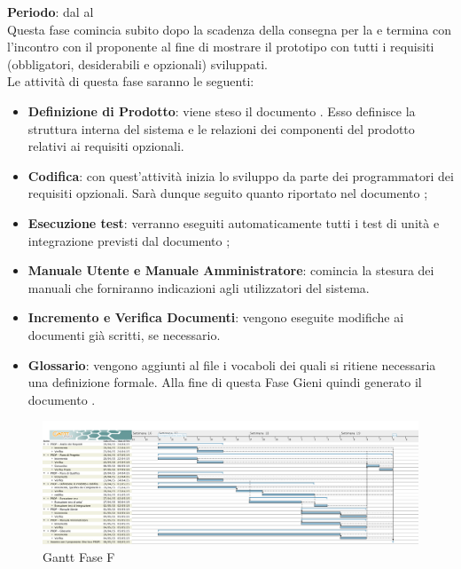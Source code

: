 	\textbf{Periodo}: dal  al  \\Questa fase comincia subito dopo la scadenza della consegna per la  e termina con l'incontro con il proponente al fine di mostrare il prototipo con tutti i requisiti (obbligatori, desiderabili e opzionali) sviluppati. 
	\\Le attività di questa fase saranno le seguenti:
	\begin{itemize}
		\item\textbf{Definizione di Prodotto}: viene steso il documento . Esso definisce la struttura interna del sistema e le relazioni dei componenti del prodotto relativi ai requisiti opzionali.
		\item \textbf{Codifica}: con quest'attività inizia lo sviluppo da parte dei programmatori dei requisiti opzionali. Sarà dunque seguito quanto riportato nel documento ;
		\item \textbf{Esecuzione test}: verranno eseguiti automaticamente tutti i test di unità e integrazione previsti dal documento ;
		\item\textbf{Manuale Utente e Manuale Amministratore}: comincia la stesura dei manuali che forniranno indicazioni agli utilizzatori del sistema.
		\item\textbf{Incremento e Verifica Documenti}: vengono eseguite modifiche ai documenti già scritti, se necessario.
		\item\textbf{Glossario}: vengono aggiunti al file  i vocaboli dei quali si ritiene necessaria una definizione formale. Alla fine di questa Fase Gieni quindi generato il documento .
	\end{itemize}
	\begin{figure}[H]\centering
		\includegraphics[width=\textwidth]{PianoDiProgetto/Pics/FaseF.png}
	\caption{Gantt Fase F}
\end{figure}
